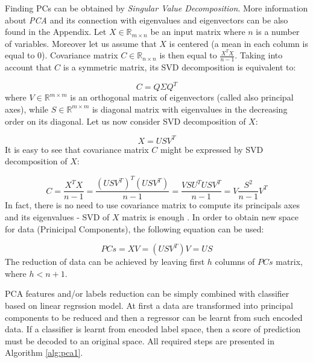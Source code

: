 Finding PCs can be obtained by \textit{Singular Value Decomposition}. More information about \textit{PCA} and its connection with eigenvalues and eigenvectors can be also found in the Appendix. Let $X \in \mathbb{R}_{m \times n}$ be an input matrix where $n$ is a number of variables. Moreover let us assume that $X$ is centered (a mean in each column is equal to $0$). Covariance matrix $C \in \mathbb{R}_{n \times n}$ is then equal to $\frac{X^TX}{n-1}$. Taking into account that $C$ is a symmetric matrix, its SVD decomposition is equivalent to:

\begin{equation}\label{eq:pca1}
    C=Q\Sigma{Q^T}
\end{equation}
where $V \in \mathbb{R}^{m \times m}$ is an orthogonal matrix of eigenvectors (called also principal axes), while $S \in \mathbb{R}^{m \times m}$ is diagonal matrix with eigenvalues in the decreasing order on its diagonal. 
Let us now consider SVD decomposition of $X$:

\begin{equation}\label{eq:pca2}
    X=USV^{T}
\end{equation}
It is easy to see that covariance matrix $C$ might be expressed by SVD decomposition of $X$:

\begin{equation}\label{eq:pca3}
    C=\frac{X^TX}{n-1} = \frac{(USV^T)^T(USV^T)}{n-1} = \frac{VSU^TUSV^T}{n-1} = V\frac{S^{2}}{n-1}V^{T} 
\end{equation}
In fact, there is no need to use covariance matrix to compute its principals axes and its eigenvalues - SVD of $X$ matrix is enough \cite{Jolliffe}. In order to obtain new space for data (Prinicipal Components), the following equation can be used:

\begin{equation}\label{eq:pca4}
    PCs = XV = (USV^{T})V = US
\end{equation}
The reduction of data can be achieved by leaving first $h$ columns of $PCs$ matrix, where $h<n+1$.

PCA features and/or labels reduction can be simply combined with classifier based on linear regrssion model. At first a data are transformed into principal components to be reduced and then a regressor can be learnt from such encoded data. If a classifier is learnt from encoded label space, then a score of prediction must be decoded to an original space. All required steps are presented in Algorithm \ref{alg:pca1}.

